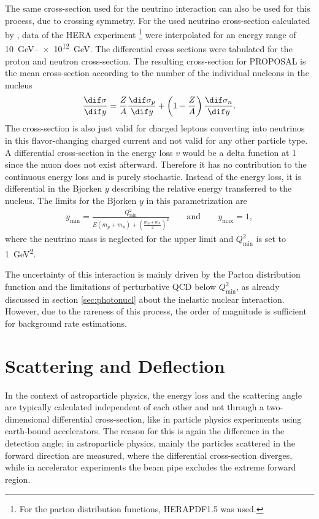 The same cross-section used for the neutrino interaction can also be used for this process, due to crossing symmetry.
For the used neutrino cross-section calculated by \cite{CSMS11NuXsection}, data of the HERA experiment \footnote{For the parton distribution functions, HERAPDF1.5 \cite{HERAPDF} was used.} were interpolated for an energy range of \SIrange{10}{e12}{GeV}.
The differential cross sections were tabulated for the proton and neutron cross-section.
The resulting cross-section for PROPOSAL is the mean cross-section according to the number of the individual nucleons in the nucleus
\begin{align}
    \frac{\dif \sigma}{\dif y} = \frac{Z}{A} \frac{\dif \sigma_p}{\dif y} + \left(1 - \frac{Z}{A} \right) \frac{\dif \sigma_n}{\dif y} .
\end{align}
The cross-section is also just valid for charged leptons converting into neutrinos in this flavor-changing charged current and not valid for any other particle type.
A differential cross-section in the energy loss $v$ would be a delta function at \num{1} since the muon does not exist afterward.
Therefore it has no contribution to the continuous energy loss and is purely stochastic.
Instead of the energy loss, it is differential in the Bjorken $y$ describing the relative energy transferred to the nucleus.
The limits for the Bjorken $y$ in this parametrization are
\begin{align}
    y_{\text{min}} = \frac{Q_{\text{min}}^2}{E (m_p + m_n) + \left( \frac{m_p + m_n}{2} \right)^2}
    \qquad \text{and} \qquad
    y_{\text{max}} = 1 ,
\end{align}
where the neutrino mass is neglected for the upper limit and $Q_{\text{min}}^2$ is set to \SI{1}{GeV^2}.

The uncertainty of this interaction is mainly driven by the Parton distribution function and the limitations of perturbative QCD below $Q_{\text{min}}^2$, as already discussed in section \ref{sec:photonucl} about the inelastic nuclear interaction.
However, due to the rareness of this process, the order of magnitude is sufficient for background rate estimations.

\section{Scattering and Deflection}

In the context of astroparticle physics, the energy loss and the scattering angle are typically calculated independent of each other and not through a two-dimensional differential cross-section, like in particle physics experiments using earth-bound accelerators.
The reason for this is again the difference in the detection angle;
in astroparticle physics, mainly the particles scattered in the forward direction are measured, where the differential cross-section diverges, while in accelerator experiments the beam pipe excludes the extreme forward region.


